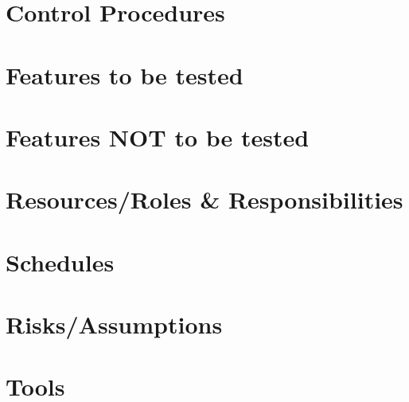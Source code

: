 \documentclass{article}
\begin{document}
\section{Control Procedures}
\newpage

\section{Features to be tested}
\newpage

\section{Features NOT to be tested}
\newpage

\section{Resources/Roles \& Responsibilities}
\newpage

\section{Schedules}
\newpage

\section{Risks/Assumptions}
\newpage

\section{Tools}
\newpage
\end{document}
